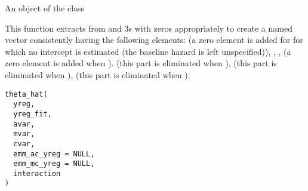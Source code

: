 \documentclass[a4paper]{book}
\begin{document}
%
\begin{Value}
An object of the class 
\end{Value}
%
\begin{Description}
This function extracts  from  and 3s with zeros appropriately to create a named vector consistently having the following elements:
 (a zero element is added for  for which no intercept is estimated (the baseline hazard is left unspecified)),
,
,
 (a zero element is added when ).
 (this part is eliminated when ),
 (this part is eliminated when ),
 (this part is eliminated when ).
\end{Description}
%
\begin{Usage}
\begin{verbatim}
theta_hat(
  yreg,
  yreg_fit,
  avar,
  mvar,
  cvar,
  emm_ac_yreg = NULL,
  emm_mc_yreg = NULL,
  interaction
)
\end{verbatim}
\end{Usage}
%
\end{document}
